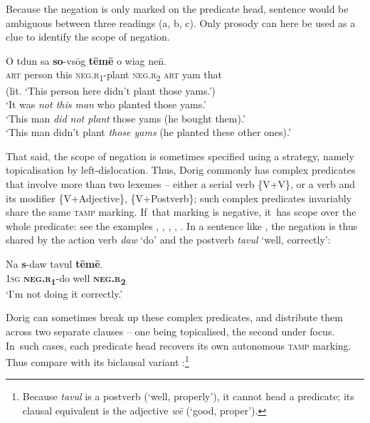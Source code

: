 \documentclass[output=paper,colorlinks,citecolor=brown,draft]{langscibook}
\begin{document}
Because the negation is only marked on the predicate head, sentence  would be ambiguous between three readings (a, b, c). Only prosody can here be used as a clue to identify the scope of negation.

\ea\label{ex:dor:plant} 
    \gll  O tdun sa \textbf{so}-vsōg \textbf{tēmē} o wiag ne\={n}.\\ 
         \textsc{art} person this \textsc{neg.r}\textsubscript{1}-plant \textsc{neg.r}\textsubscript{2} \textsc{art} yam that \\
    \glt (lit. ‘This person here didn’t plant those yams.’)\\
    \ea ‘It was \textit{not this man} who planted those yams.’ \\
    \ex ‘This man \textit{did not plant} those yams (he bought them).’\\ 
    \ex ‘This man didn’t plant \textit{those yams} (he planted these other ones).’
    \z 
\z 

That said, the scope of negation is sometimes specified using a strategy, namely topicalisation by left-dislocation. Thus, Dorig commonly has complex predicates that involve more than two lexemes – either a serial verb \{V+V\}, or a verb and its modifier \{V+Adjective\}, \{V+Postverb\}; such complex predicates invariably share the same \textsc{tamp} marking. If~that marking is negative, it~has scope over the whole predicate: see the examples , , , , . In a sentence like , the negation is thus shared by the action verb \textit{daw} ‘do’ and the postverb \textit{tavul} ‘well, correctly’:

\ea\label{ex:dor:correctly} 
    \gll  Na \textbf{s}-daw tavul \textbf{tēmē}.\\ 
          \textsc{1sg} \textbf{\textsc{neg.r}}\textbf{\textsubscript{1}}-do well \textbf{\textsc{neg.r}}\textbf{\textsubscript{2}} \\
    \glt ‘I’m not doing it correctly.’ 
\z 

Dorig can sometimes break up these complex predicates, and distribute them across two separate clauses – one being topicalised, the second under focus. In~such cases, each predicate head recovers its own autonomous \textsc{tamp} marking. Thus compare  with its biclausal variant :\footnote{Because \textit{tavul} is a postverb (‘well, properly’), it cannot head a predicate; its clausal equivalent is the adjective \textit{wē} (‘good, proper’).}
\end{document}

